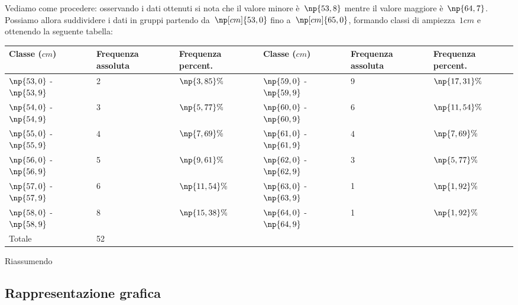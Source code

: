 \begin{exrig}
\begin{esempio}
Vediamo come procedere: osservando i dati ottenuti si nota che il valore minore è~$\np{53,8}$ mentre il valore maggiore è~$\np{64,7}$. Possiamo allora suddividere
i dati in gruppi partendo da~$\np[cm]{53,0}$ fino a~$\np[cm]{65,0}$, formando classi di ampiezza~$1 \unit{cm}$ e ottenendo la seguente tabella:

\begin{center}
\begin{tabularx}{.9\textwidth}{*{2}{lXX}}
\toprule
Classe ($\unit{cm}$) & Frequenza assoluta & Frequenza percent. &Classe ($\unit{cm}$) & Frequenza assoluta & Frequenza percent. \\
\midrule
$\np{53,0}$ - $\np{53,9}$ & 2 & $\np{3,85}\%$ & $\np{59,0}$ - $\np{59,9}$ & 9 & $\np{17,31}\%$\\
$\np{54,0}$ - $\np{54,9}$ & 3 & $\np{5,77}\%$ & $\np{60,0}$ - $\np{60,9}$ & 6 & $\np{11,54}\%$\\
$\np{55,0}$ - $\np{55,9}$ & 4 & $\np{7,69}\%$ & $\np{61,0}$ - $\np{61,9}$ & 4 & $\np{7,69}\%$\\
$\np{56,0}$ - $\np{56,9}$ & 5 & $\np{9,61}\%$ & $\np{62,0}$ - $\np{62,9}$ & 3 & $\np{5,77}\%$\\
$\np{57,0}$ - $\np{57,9}$ & 6 & $\np{11,54}\%$ & $\np{63,0}$ - $\np{63,9}$ & 1 & $\np{1,92}\%$\\
$\np{58,0}$ - $\np{58,9}$ & 8 & $\np{15,38}\%$ & $\np{64,0}$ - $\np{64,9}$ & 1 & $\np{1,92}\%$\\
\midrule
Totale & 52 & &&&\\
\bottomrule
\end{tabularx}
\end{center}


\end{esempio}
\end{exrig}

Riassumendo
\begin{center}
 
\end{center}

\ovalbox{\risolvii \ref{ese:A.2}, \ref{ese:A.3}, \ref{ese:A.5}, \ref{ese:A.6}, \ref{ese:A.7}, \ref{ese:A.8}, \ref{ese:A.9}}

\subsection{Rappresentazione grafica}

